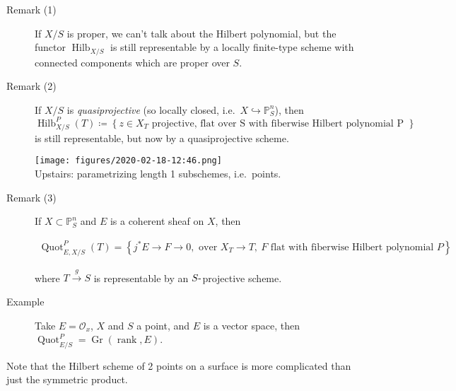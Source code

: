 \begin{description}
\item[Remark (1)]
If \(X/S\) is proper, we can't talk about the Hilbert polynomial, but
the functor \(\operatorname{Hilb}_{X/S}\) is still representable by a
locally finite-type scheme with connected components which are proper
over \(S\).
\item[Remark (2)]
If \(X/S\) is \emph{quasiprojective} (so locally closed,
i.e.~\(X\hookrightarrow{\mathbb{P}}^n_S\)), then
\(\operatorname{Hilb}_{X/S}^P(T) \coloneqq\left\{{z\in X_T \text{ projective, flat over S with fiberwise Hilbert polynomial P }}\right\}\)
is still representable, but now by a quasiprojective scheme.


\texttt{[image: figures/2020-02-18-12:46.png]}\\

Upstairs: parametrizing length 1 subschemes, i.e.~points.
\item[Remark (3)]
If \(X\subset {\mathbb{P}}_S^n\) and \(E\) is a coherent sheaf on \(X\),
then

\begin{align*} \operatorname{Quot}_{E, X/S}^{P}(T) = \left\{{ j^*E \to F \to 0, \text{ over } X_T \to T,~F \text{ flat with fiberwise Hilbert polynomial  } P  }\right\} \end{align*}

where \(T \xrightarrow{g} S\) is representable by an
\(S{\hbox{-}}\)projective scheme.
\item[Example]
Take \(E = {\mathcal{O}}_x\), \(X\) and \(S\) a point, and \(E\) is a
vector space, then
\(\operatorname{Quot}_{E/S}^P = {\operatorname{Gr}}(\operatorname{rank}, E)\).
\end{description}

Note that the Hilbert scheme of 2 points on a surface is more
complicated than just the symmetric product.

